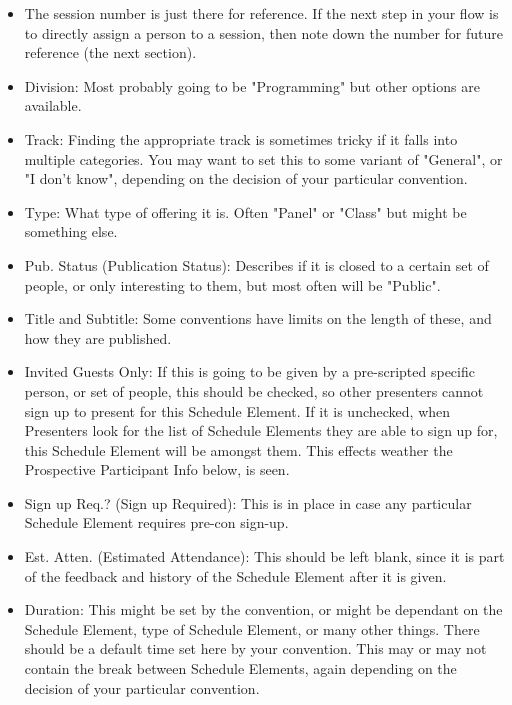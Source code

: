\documentclass[captions=tablesignature]{scrartcl}
\begin{document}
\begin{itemize}
\item The session number is just there for reference.  If the next step
in your flow is to directly assign a person to a session, then
note down the number for future reference (the next section).

\item Division: Most probably going to be "Programming" but other
options are available.

\item Track: Finding the appropriate track is sometimes tricky if it
falls into multiple categories.  You may want to set this to
some variant of "General", or "I don't know", depending on the
decision of your particular convention.

\item Type: What type of offering it is.  Often "Panel" or "Class" but
might be something else.

\item Pub. Status (Publication Status): Describes if it is closed to a
certain set of people, or only interesting to them, but most
often will be "Public".

\item Title and Subtitle: Some conventions have limits on the length of
these, and how they are published.

\item Invited Guests Only: If this is going to be given by a
pre-scripted specific person, or set of people, this should be
checked, so other presenters cannot sign up to present for this
Schedule Element.  If it is unchecked, when Presenters look for
the list of Schedule Elements they are able to sign up for, this
Schedule Element will be amongst them.  This effects weather the
Prospective Participant Info below, is seen.

\item Sign up Req.? (Sign up Required): This is in place in case any
particular Schedule Element requires pre-con sign-up.

\item Est. Atten. (Estimated Attendance): This should be left blank,
since it is part of the feedback and history of the Schedule
Element after it is given.

\item Duration: This might be set by the convention, or might be
dependant on the Schedule Element, type of Schedule Element, or
many other things.  There should be a default time set here by
your convention.  This may or may not contain the break
between Schedule Elements, again depending on the decision of
your particular convention.


\end{itemize}
\end{document}
